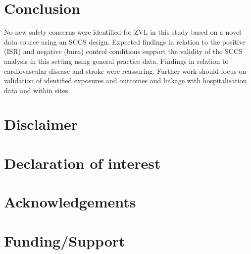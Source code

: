 \documentclass[review, endfloat]{elsarticle}
\begin{document}
\section{Conclusion}

No new safety concerns were identified for ZVL in this study based on a novel data source using an SCCS design. Expected findings in relation to the positive (ISR) and negative (burn) control conditions support the validity of the SCCS analysis in this setting using general practice data. Findings in relation to cardiovascular disease and stroke were reassuring. Further work should focus on validation of identified exposures and outcomes and linkage with hospitalisation data and within sites.

\section{Disclaimer}

\section{Declaration of interest}

\section{Acknowledgements}

\section{Funding/Support}

\listoftodos[Notes]




\end{document}
